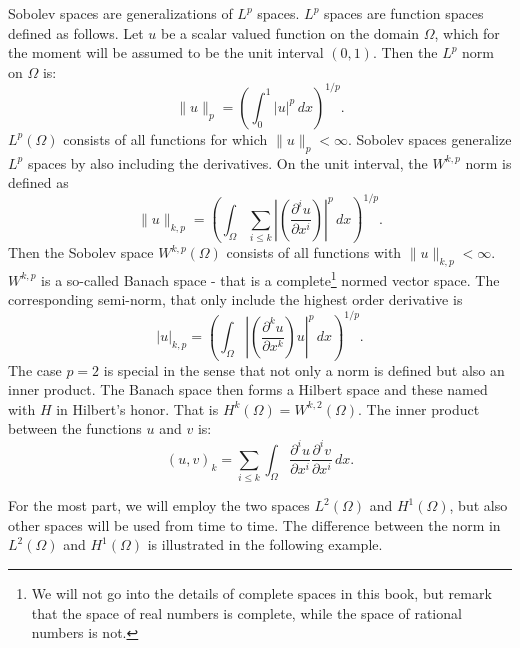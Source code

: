 Sobolev spaces are generalizations of $L^p$ spaces. $L^p$ spaces are function spaces defined as follows.  
Let $u$ be a scalar valued function on the domain $\Omega$, which for 
the moment will be assumed to be the unit interval $(0,1)$. Then the $L^p$ norm on $\Omega$ is:    
\[
\|u\|_p = (\int_0^1 |u|^p \, dx)^{1/p} .    
\]
$L^p(\Omega)$ consists of all functions for which $\|u\|_p < \infty$. 
Sobolev spaces generalize $L^p$ spaces by also including the derivatives.  
On the unit interval, the $W^{k,p}$ norm is defined as  
\begin{equation}
\label{Wpk}
\|u\|_{k,p} = (\int_\Omega \sum_{i \le k} |(\frac{\partial^i u}{\partial x^i}) |^p \, dx)^{1/p} .    
\end{equation}
Then the Sobolev space $W^{k,p}(\Omega)$ consists of 
all functions with $\|u\|_{k,p} < \infty$. $W^{k,p}$ is a so-called Banach space - that is 
a complete\footnote{We will not go into the details of complete spaces in this book, but remark that
the space of real numbers is complete, while the space of rational numbers is not. } normed vector space. 
The corresponding semi-norm, that only include the highest order derivative is 
\begin{equation}
\label{semiWpk}
|u|_{k,p} = (\int_\Omega  |(\frac{\partial^k u}{\partial x^k})   u|^p \, dx)^{1/p} .    
\end{equation}
The case $p=2$ is special in the sense that not only a norm is defined but also an inner product.    
The Banach space then forms a Hilbert space and these named with $H$ in Hilbert's honor. 
That is $H^k(\Omega) = W^{k,2}(\Omega)$. The inner product between the functions $u$ and $v$ is:  
\[
(u, v)_{k} = \sum_{i \le k} \int_\Omega \frac{\partial^i u}{\partial x^i} \frac{\partial^i v}{\partial x^i} \,  dx.    
\]

For the most part, we will employ the two spaces $L^2(\Omega)$ and $H^1(\Omega)$, but also other
spaces will be used from time to time.  
The difference between the norm in $L^2(\Omega)$ and $H^1(\Omega)$ is illustrated in the following example.   



